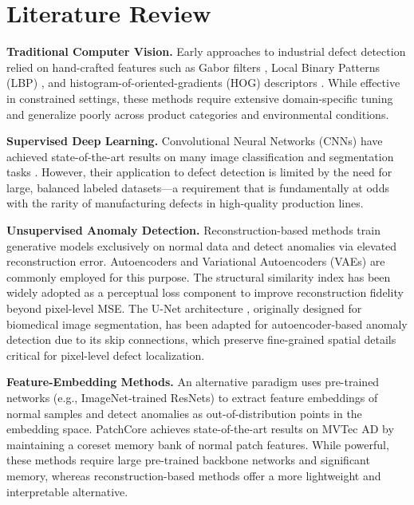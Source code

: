 \documentclass{article}
\begin{document}
\section{Literature Review}

\textbf{Traditional Computer Vision.} Early approaches to industrial defect detection relied on hand-crafted features such as Gabor filters \citep{jain1991unsupervised}, Local Binary Patterns (LBP) \citep{ojala2002multiresolution}, and histogram-of-oriented-gradients (HOG) descriptors \citep{dalal2005histograms}. While effective in constrained settings, these methods require extensive domain-specific tuning and generalize poorly across product categories and environmental conditions.

\textbf{Supervised Deep Learning.} Convolutional Neural Networks (CNNs) have achieved state-of-the-art results on many image classification and segmentation tasks \citep{he2016deep, ronneberger2015u}. However, their application to defect detection is limited by the need for large, balanced labeled datasets---a requirement that is fundamentally at odds with the rarity of manufacturing defects in high-quality production lines.

\textbf{Unsupervised Anomaly Detection.} Reconstruction-based methods train generative models exclusively on normal data and detect anomalies via elevated reconstruction error. Autoencoders \citep{hinton2006reducing} and Variational Autoencoders (VAEs) \citep{kingma2013auto} are commonly employed for this purpose. The structural similarity index \citep{wang2004image} has been widely adopted as a perceptual loss component to improve reconstruction fidelity beyond pixel-level MSE. The U-Net architecture \citep{ronneberger2015u}, originally designed for biomedical image segmentation, has been adapted for autoencoder-based anomaly detection due to its skip connections, which preserve fine-grained spatial details critical for pixel-level defect localization.

\textbf{Feature-Embedding Methods.} An alternative paradigm uses pre-trained networks (e.g., ImageNet-trained ResNets) to extract feature embeddings of normal samples and detect anomalies as out-of-distribution points in the embedding space. PatchCore \citep{roth2022towards} achieves state-of-the-art results on MVTec AD by maintaining a coreset memory bank of normal patch features. While powerful, these methods require large pre-trained backbone networks and significant memory, whereas reconstruction-based methods offer a more lightweight and interpretable alternative.
\end{document}
